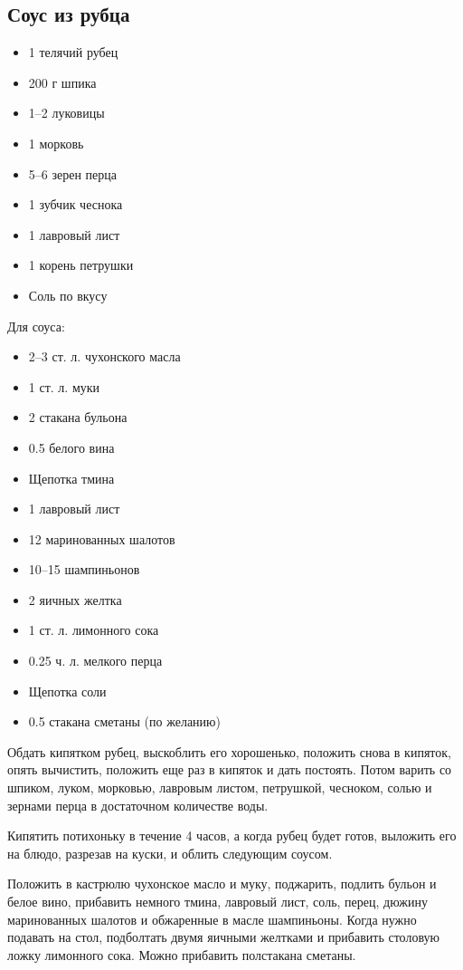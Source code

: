 \subsection{Соус из рубца}

\begin{itemize}
	\item 1 телячий рубец 
    \item 200 г шпика 
    \item 1–2 луковицы
    \item 1 морковь 
    \item 5–6 зерен перца
    \item 1 зубчик чеснока 
    \item 1 лавровый лист
    \item 1 корень петрушки
    \item Соль по вкусу
\end{itemize}

Для соуса: 

\begin{itemize}
	\item 2–3 ст. л. чухонского масла
    \item 1 ст. л. муки
    \item 2 стакана бульона 
    \item 0.5 белого вина
    \item Щепотка тмина
    \item 1 лавровый лист
    \item 12 маринованных шалотов
    \item 10–15 шампиньонов
    \item 2 яичных желтка
    \item 1 ст. л. лимонного сока
    \item 0.25 ч. л. мелкого перца
    \item Щепотка соли
    \item 0.5 стакана сметаны (по желанию)
\end{itemize}

Обдать кипятком рубец, выскоблить его хорошенько, положить снова в кипяток, опять вычистить, положить еще раз в кипяток и дать постоять. Потом варить со шпиком, луком, морковью, лавровым листом, петрушкой, чесноком, солью и зернами перца в достаточном количестве воды.

Кипятить потихоньку в течение 4 часов, а когда рубец будет готов, выложить его на блюдо, разрезав на куски, и облить следующим соусом.

Положить в кастрюлю чухонское масло и муку, поджарить, подлить бульон и белое вино, прибавить немного тмина, лавровый лист, соль, перец, дюжину маринованных шалотов и обжаренные в масле шампиньоны. Когда нужно подавать на стол, подболтать двумя яичными желтками и прибавить столовую ложку лимонного сока. Можно прибавить полстакана сметаны.

